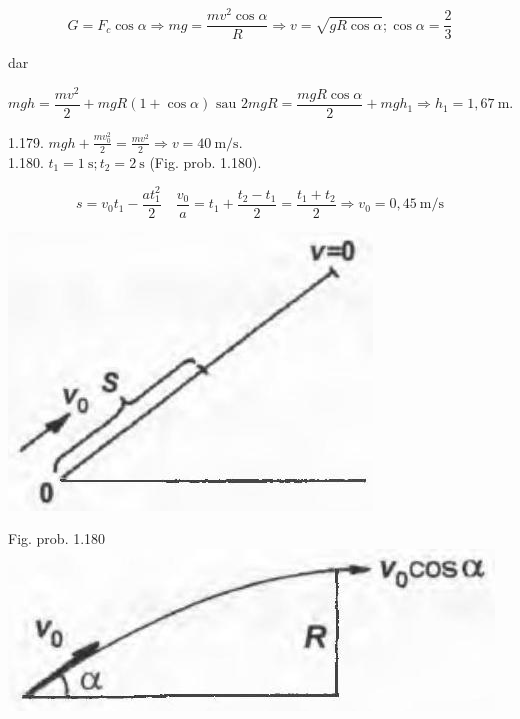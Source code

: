 \documentclass[10pt]{article}
\begin{document}
$$
G=F_{c} \cos \alpha \Rightarrow m g=\frac{m v^{2} \cos \alpha}{R} \Rightarrow v=\sqrt{g R \cos \alpha} ; \cos \alpha=\frac{2}{3}
$$

dar

$$
m g h=\frac{m v^{2}}{2}+m g R(1+\cos \alpha) \text { sau } 2 m g R=\frac{m g R \cos \alpha}{2}+m g h_{1} \Rightarrow h_{1}=1,67 \mathrm{~m} .
$$

1.179. $m g h+\frac{m v_{0}^{2}}{2}=\frac{m v^{2}}{2} \Rightarrow v=40 \mathrm{~m} / \mathrm{s}$.\\
1.180. $t_{1}=1 \mathrm{~s} ; t_{2}=2 \mathrm{~s}$ (Fig. prob. 1.180).

$$
s=v_{0} t_{1}-\frac{a t_{1}^{2}}{2} \quad \frac{v_{0}}{a}=t_{1}+\frac{t_{2}-t_{1}}{2}=\frac{t_{1}+t_{2}}{2} \Rightarrow v_{0}=0,45 \mathrm{~m} / \mathrm{s}
$$

\begin{center}
\includegraphics[max width=\textwidth]{2025_07_01_5b3ff9fa0d508c8e9f17g-239}
\end{center}

Fig. prob. 1.180\\
\includegraphics[max width=\textwidth, center]{2025_07_01_5b3ff9fa0d508c8e9f17g-239(1)}
\end{document}
